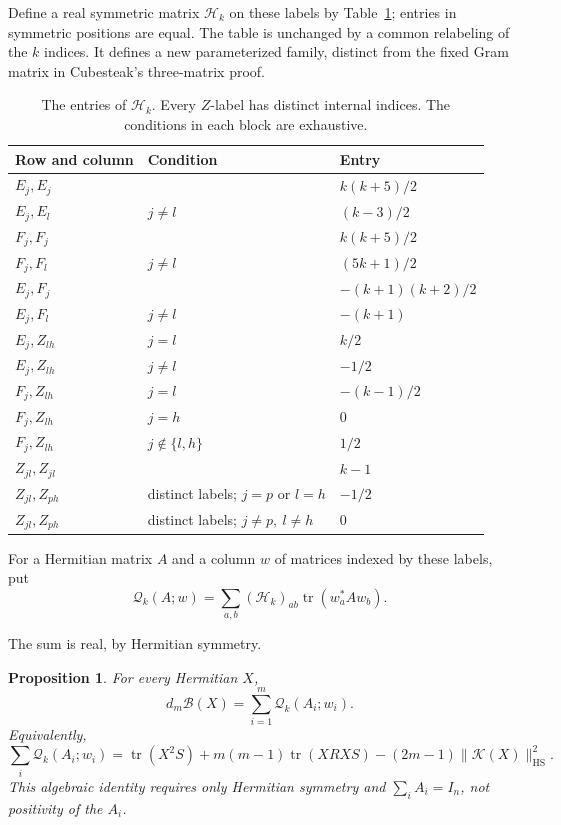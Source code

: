 \documentclass[11pt]{article}
\newtheorem{proposition}[theorem]{Proposition}
\newcommand{\tr}{\operatorname{tr}}
\newcommand{\HS}{\mathrm{HS}}
\newcommand{\Id}{I_n}
\newcommand{\cK}{\mathcal K}
\newcommand{\cB}{\mathcal B}
\newcommand{\gH}{\mathscr H}
\newcommand{\gQ}{\mathscr Q}
\newcommand{\nrm}[1]{\lVert #1\rVert}
\begin{document}
Define a real symmetric matrix \(\gH_k\) on these labels by
Table~\ref{tab:gram}; entries in symmetric positions are equal.
The table is unchanged by a common relabeling of the \(k\) indices.
It defines a new parameterized family, distinct from the fixed Gram
matrix in Cubesteak's three-matrix proof.

\begin{table}[htbp]
\centering
\caption{The entries of \(\gH_k\). Every \(Z\)-label has distinct internal
indices. The conditions in each block are exhaustive.}
\label{tab:gram}
\renewcommand{\arraystretch}{1.18}
\begin{tabular}{lll}
\toprule
Row and column & Condition & Entry\\
\midrule
\(E_j,E_j\) & & \(k(k+5)/2\)\\
\(E_j,E_l\) & \(j\ne l\) & \((k-3)/2\)\\
\(F_j,F_j\) & & \(k(k+5)/2\)\\
\(F_j,F_l\) & \(j\ne l\) & \((5k+1)/2\)\\
\(E_j,F_j\) & & \(-(k+1)(k+2)/2\)\\
\(E_j,F_l\) & \(j\ne l\) & \(-(k+1)\)\\
\(E_j,Z_{lh}\) & \(j=l\) & \(k/2\)\\
\(E_j,Z_{lh}\) & \(j\ne l\) & \(-1/2\)\\
\(F_j,Z_{lh}\) & \(j=l\) & \(-(k-1)/2\)\\
\(F_j,Z_{lh}\) & \(j=h\) & \(0\)\\
\(F_j,Z_{lh}\) & \(j\notin\{l,h\}\) & \(1/2\)\\
\(Z_{jl},Z_{jl}\) & & \(k-1\)\\
\(Z_{jl},Z_{ph}\) & distinct labels; \(j=p\) or \(l=h\) & \(-1/2\)\\
\(Z_{jl},Z_{ph}\) & distinct labels; \(j\ne p,\ l\ne h\) & \(0\)\\
\bottomrule
\end{tabular}
\end{table}

For a Hermitian matrix \(A\) and a column \(w\) of matrices indexed by
these labels, put
\begin{equation}\label{eq:gram-functional}
 \gQ_k(A;w)=\sum_{a,b}(\gH_k)_{ab}\tr(w_a^*Aw_b).
\end{equation}

The sum is real, by Hermitian symmetry.

\begin{proposition}\label{prop:identity}
For every Hermitian \(X\),
\begin{equation}\label{eq:universal-gram}
 d_m\cB(X)=\sum_{i=1}^m\gQ_k(A_i;w_i).
\end{equation}
Equivalently,
\begin{equation}\label{eq:expanded-target}
 \sum_i\gQ_k(A_i;w_i)
 =\tr(X^2S)+m(m-1)\tr(XRXS)
   -(2m-1)\nrm{\cK(X)}_{\HS}^2.
\end{equation}
This algebraic identity requires only Hermitian symmetry and
\(\sum_iA_i=\Id\), not positivity of the \(A_i\).
\end{proposition}
\end{document}
